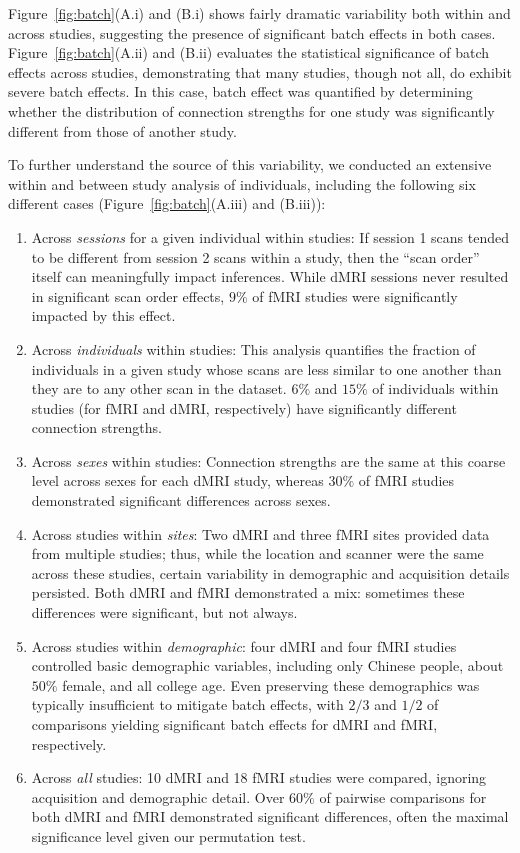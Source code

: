 \documentclass[11pt]{article}
\begin{document}
\begin{multicols}{2}
Figure~\ref{fig:batch}(A.i) and (B.i) shows fairly dramatic variability both within and across studies, suggesting the presence of significant batch effects in both cases. Figure~\ref{fig:batch}(A.ii) and (B.ii) evaluates the statistical significance of batch effects across studies, demonstrating that many studies, though not all, do exhibit severe batch effects. In this case, batch effect was quantified by determining whether the distribution of connection strengths for one study was significantly different from those of another study.

To further understand the source of this variability, we conducted an extensive within and between study analysis of individuals, including the following six different cases (Figure~\ref{fig:batch}(A.iii) and (B.iii)):
\begin{enumerate}[wide, labelwidth=!, labelindent=0pt, label=\bf{\arabic*)}]
        \item  Across \emph{sessions} for a given individual within studies:  If  session 1  scans tended to be different from session 2 scans within a study, then the ``scan order'' itself can meaningfully impact inferences. While dMRI sessions never resulted in significant scan order effects, $9\%$ of fMRI studies were significantly impacted by this effect.   
        \item Across \emph{individuals} within studies: This analysis quantifies the fraction of individuals in a given study whose scans are less similar to one another than they are to any other scan in the dataset. $6\%$ and $15\%$ of individuals within studies (for fMRI and dMRI, respectively) have significantly different connection strengths.
        \item Across \emph{sexes} within studies: Connection strengths are the same at this coarse level across sexes for each dMRI study, whereas $30\%$ of fMRI studies demonstrated significant differences across sexes.
        \item Across studies within \emph{sites}: Two dMRI and three fMRI sites provided data from multiple studies; thus, while the location and scanner were the same across these studies, certain variability in demographic and acquisition details persisted. Both dMRI and fMRI demonstrated a mix: sometimes these differences were significant, but not always. 
        \item Across studies within \emph{demographic}: four dMRI and four fMRI studies controlled basic demographic variables,  including only Chinese people, about $50\%$ female, and all college age. Even preserving these demographics was typically insufficient to mitigate batch effects, with $2/3$ and $1/2$ of comparisons yielding significant batch effects for dMRI and fMRI, respectively.
        \item Across \emph{all} studies: 10 dMRI and 18 fMRI studies were compared, ignoring acquisition and demographic detail. Over $60\%$ of pairwise comparisons for both dMRI and fMRI demonstrated significant differences, often the maximal significance level given our permutation test.
\end{enumerate} 


\end{multicols}
\end{document}

